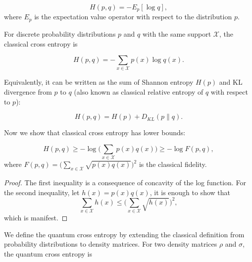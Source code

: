 \documentclass[11pt]{article}
\theoremstyle{definition}
\begin{document}
\begin{equation}
    H(p,q) = -E_p [\log q],
\end{equation}
where $E_p$ is the expectation value operator with respect to the distribution $p$. 

For discrete probability distributions $p$ and $q$ with the same support $\mathcal{X}$, the classical cross entropy is

\begin{equation}
    H(p,q) = -\sum_{x \in \mathcal{X}} p(x) \log q(x).
\end{equation}

Equivalently, it can be written as the sum of Shannon entropy $H(p)$ and KL divergence from $p$ to $q$ (also known as classical relative entropy of $q$ with respect to $p$):

\begin{equation}
\label{classical entropy}
    H(p,q) = H(p) + D_{KL} (p \| q).
\end{equation}




Now we show that classical cross entropy has lower bounds:


\begin{equation}
    H(p,q) \geq -\log \Big(\sum_{x \in \mathcal{X}}
    p(x) q(x) \Big) \geq - \log F(p,q),
\end{equation}
where $F(p,q) = \Big(\sum_{x \in \mathcal{X}} \sqrt{p(x) q(x)}\Big)^2$ is the classical fidelity.




\begin{proof}
The first inequality is a consequence of concavity of the log function. For the second inequality, let $h(x) = p(x) q(x)$, it is enough to show that 
\begin{equation}
    \sum_{x \in \mathcal{X}} h(x) \leq \Big(\sum_{x \in \mathcal{X}} \sqrt{h(x)} \Big)^2,
\end{equation}
which is manifest.
\end{proof}


We define the quantum cross entropy by extending the classical definition from probability distributions to density matrices. For two density matrices $\rho$ and $\sigma$, the quantum cross entropy is
\end{document}
